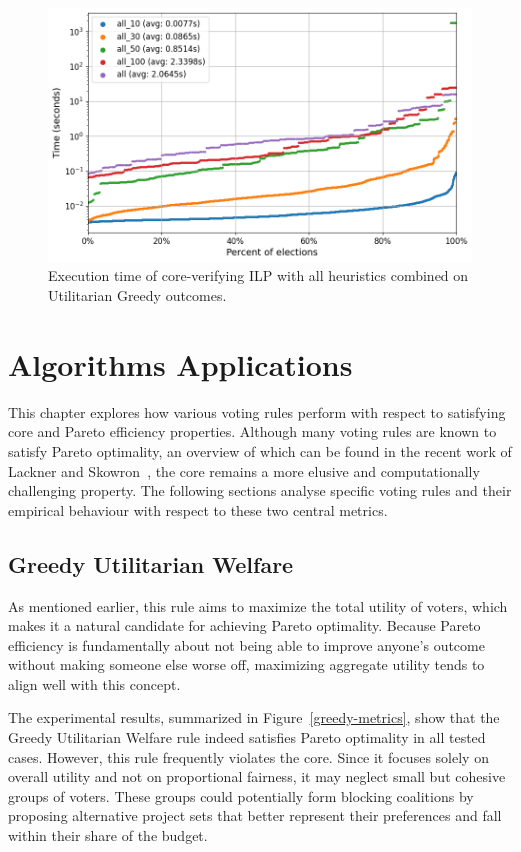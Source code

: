 \documentclass[magisterska,en]{pracamgr}
\newcommand\chartsize{0.94}
\begin{document}
\begin{figure}[h!]
    \centering
    \includegraphics[width=\chartsize\linewidth]{outputs/Combined/greedy.png}
    \caption{Execution time of core-verifying ILP with all heuristics combined on Utilitarian Greedy outcomes.}
    \label{combined-greedy}
\end{figure}

\chapter{Algorithms Applications}
\label{algorithms-applications}

This chapter explores how various voting rules perform with respect to satisfying core and Pareto efficiency properties. Although many voting rules are known to satisfy Pareto optimality, an overview of which can be found in the recent work of Lackner and Skowron~\cite{20}, the core remains a more elusive and computationally challenging property. The following sections analyse specific voting rules and their empirical behaviour with respect to these two central metrics.

\section{Greedy Utilitarian Welfare}

As mentioned earlier, this rule aims to maximize the total utility of voters, which makes it a natural candidate for achieving Pareto optimality. Because Pareto efficiency is fundamentally about not being able to improve anyone’s outcome without making someone else worse off, maximizing aggregate utility tends to align well with this concept.

The experimental results, summarized in Figure~\ref{greedy-metrics}, show that the Greedy Utilitarian Welfare rule indeed satisfies Pareto optimality in all tested cases. However, this rule frequently violates the core. Since it focuses solely on overall utility and not on proportional fairness, it may neglect small but cohesive groups of voters. These groups could potentially form blocking coalitions by proposing alternative project sets that better represent their preferences and fall within their share of the budget.
\end{document}

